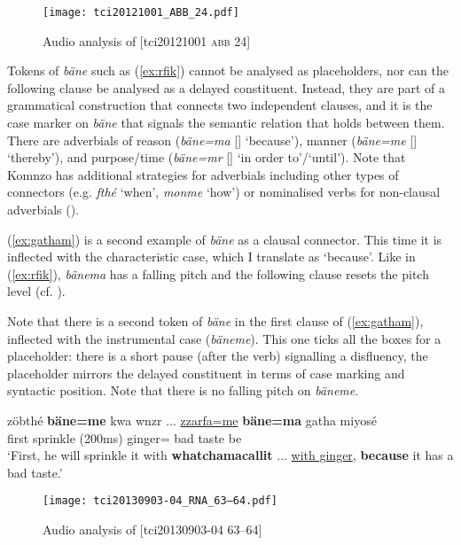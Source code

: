 \documentclass[output=paper,colorlinks,citecolor=brown]{langscibook}
\begin{document}
\begin{figure}
    \texttt{[image: tci20121001\_ABB\_24.pdf]}
    \caption{Audio analysis of [tci20121001 \textsc{abb} 24]}
    \label{fig:doehler:rfik}
\end{figure}

Tokens of \textit{bäne} such as (\ref{ex:rfik}) cannot be analysed as placeholders, nor can the following clause be analysed as a delayed constituent. Instead, they are part of a grammatical construction that connects two independent clauses, and it is the case marker on \textit{bäne} that signals the semantic relation that holds between them. There are adverbials of reason (\textit{bäne=ma} [] `because'), manner (\textit{bäne=me} [] `thereby'), and purpose/time (\textit{bäne=mr} [] `in order to'/`until'). Note that Komnzo has additional strategies for adverbials including other types of connectors (e.g. \textit{fthé} `when', \textit{monme} `how') or nominalised verbs for non-clausal adverbials (\cite[321ff.]{Dohler:2018qt}).

(\ref{ex:gatham}) is a second example of \textit{bäne} as a clausal connector. This time it is inflected with the characteristic case, which I translate as `because'. Like in (\ref{ex:rfik}), \textit{bänema} has a falling pitch and the following clause resets the pitch level (cf. ).

Note that there is a second token of \textit{bäne} in the first clause of (\ref{ex:gatham}), inflected with the instrumental case (\textit{bäneme}). This one ticks all the boxes for a placeholder: there is a short pause (after the verb) signalling a disfluency, the placeholder mirrors the delayed constituent in terms of case marking and syntactic position. Note that there is no falling pitch on \textit{bäneme}.

\ea \label{ex:gatham}
    \gll zöbthé \textbf{bäne=me} kwa wnzr ... \uline{zzarfa=me} \textbf{bäne=ma} gatha miyosé \\
    first   sprinkle (200ms) ginger=  bad taste be\\
    \glt `First, he will sprinkle it with \textbf{whatchamacallit} ... \uline{with ginger}, \textbf{because} it has a bad taste.' 
\z

\begin{figure}
    \texttt{[image: tci20130903-04\_RNA\_63–64.pdf]}
    \caption{Audio analysis of [tci20130903-04  63--64]}
    \label{fig:doehler:gatham}
\end{figure}
\end{document}

